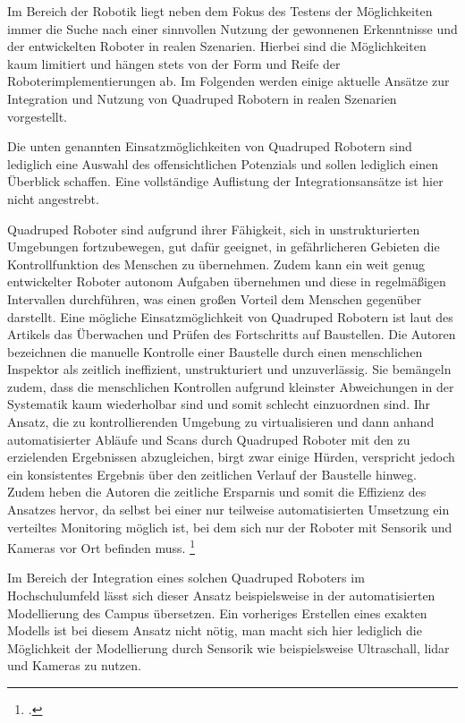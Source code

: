 Im Bereich der Robotik liegt neben dem Fokus des Testens der Möglichkeiten immer die Suche nach einer sinnvollen Nutzung
der gewonnenen Erkenntnisse und der entwickelten Roboter in realen Szenarien.
Hierbei sind die Möglichkeiten kaum limitiert und hängen stets von der Form und Reife der Roboterimplementierungen ab.
Im Folgenden werden einige aktuelle Ansätze zur Integration und Nutzung von Quadruped Robotern in realen Szenarien vorgestellt.

Die unten genannten Einsatzmöglichkeiten von Quadruped Robotern sind lediglich eine Auswahl des offensichtlichen
Potenzials und sollen lediglich einen Überblick schaffen.
Eine vollständige Auflistung der Integrationsansätze ist hier nicht angestrebt.


Quadruped Roboter sind aufgrund ihrer Fähigkeit, sich in unstrukturierten Umgebungen fortzubewegen, gut dafür geeignet,
in gefährlicheren Gebieten die Kontrollfunktion des Menschen zu übernehmen.
Zudem kann ein weit genug entwickelter Roboter autonom Aufgaben übernehmen und diese in regelmäßigen Intervallen durchführen,
was einen großen Vorteil dem Menschen gegenüber darstellt.
Eine mögliche Einsatzmöglichkeit von Quadruped Robotern ist laut des Artikels  das Überwachen und
Prüfen des Fortschritts auf Baustellen.
Die Autoren bezeichnen die manuelle Kontrolle einer Baustelle durch einen menschlichen Inspektor als zeitlich ineffizient,
unstrukturiert und unzuverlässig.
Sie bemängeln zudem, dass die menschlichen Kontrollen aufgrund kleinster Abweichungen in der Systematik kaum wiederholbar sind
und somit schlecht einzuordnen sind.
Ihr Ansatz, die zu kontrollierenden Umgebung zu virtualisieren und dann anhand automatisierter Abläufe und Scans durch
Quadruped Roboter mit den zu erzielenden Ergebnissen abzugleichen, birgt zwar einige Hürden, verspricht jedoch
ein konsistentes Ergebnis über den zeitlichen Verlauf der Baustelle hinweg.
Zudem heben die Autoren die zeitliche Ersparnis und somit die Effizienz des Ansatzes hervor, da selbst bei einer nur teilweise
automatisierten Umsetzung ein verteiltes Monitoring möglich ist, bei dem sich nur der Roboter mit Sensorik und Kameras vor Ort befinden muss.
\footcite{construction_quadruped}

Im Bereich der Integration eines solchen Quadruped Roboters im Hochschulumfeld lässt sich dieser Ansatz beispielsweise
in der automatisierten Modellierung des Campus übersetzen.
Ein vorheriges Erstellen eines exakten Modells ist bei diesem Ansatz nicht nötig, man macht sich hier lediglich die
Möglichkeit der Modellierung durch Sensorik wie beispielsweise Ultraschall, \gls{lidar} und Kameras zu nutzen.


